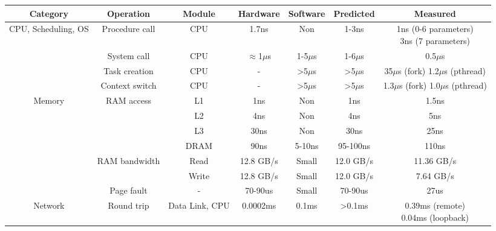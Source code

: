
\begin{table*}[t]
	\centering
	\begin{tabular}{c|c|c|c|c|c|c}
		\hline
		\textbf{Category} & \textbf{Operation} & \textbf{Module} & \textbf{Hardware} & \textbf{Software}  & \textbf{Predicted} & \textbf{Measured} \\ \hline \hline

		\multirow{4}{*}{CPU, Scheduling, OS} & Procedure call & CPU & 1.7ns & Non  & 1-3ns & \makecell{1ns (0-6 parameters) \\ 3ns (7 parameters)} \\ \cline{2-7}

          & System call & CPU & $\approx$1$\mu$s & 1-5$\mu$s & 1-6$\mu$s & 0.5$\mu$s \\ \cline{2-7}
          
          & Task creation & CPU & - & >5$\mu$s & >5$\mu$s & \makecell{35$\mu$s (fork) \\ 1.2$\mu$s (pthread)} \\ \cline{2-7}
        
          & Context switch & CPU & - & >5$\mu$s & >5$\mu$s & \makecell{1.3$\mu$s (fork) \\ 1.0$\mu$s (pthread)} \\ \hline

        \multirow{6}{*}{Memory} & \multirow{4}{*}{RAM access} & L1 & 1ns & Non & 1ns & 1.5ns \\ \cline{3-7}
                                &  & L2 & 4ns & Non & 4ns & 5ns \\ \cline{3-7}
                                &  & L3 & 30ns & Non & 30ns & 25ns \\ \cline{3-7}
                                &  & DRAM & 90ns & 5-10ns & 95-100ns & 110ns \\ \cline{2-7}

          & \multirow{2}{*}{RAM bandwidth} & Read & 12.8 GB/s & Small & 12.0 GB/s &  11.36 GB/s \\ \cline{3-7}

          & & Write & 12.8 GB/s & Small & 12.0 GB/s & 7.64 GB/s \\ \cline{2-7}

          & Page fault & - & 70-90us & Small & 70-90us & 27us \\ \hline

          \multirow{3}{*}{Network} & Round trip & Data Link, CPU & 0.0002ms & 0.1ms & >0.1ms & \makecell{0.39ms (remote) \\ 0.04ms (loopback)} \\ \cline{2-7}


\end{tabular}
\end{table*}
